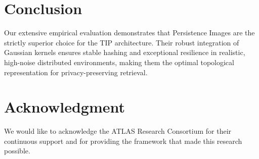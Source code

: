 \documentclass[10pt, conference]{IEEEtran}
\begin{document}
\section{Conclusion}
Our extensive empirical evaluation demonstrates that Persistence Images are the strictly superior choice for the TIP architecture. Their robust integration of Gaussian kernels ensures stable hashing and exceptional resilience in realistic, high-noise distributed environments, making them the optimal topological representation for privacy-preserving retrieval.

\section*{Acknowledgment}
We would like to acknowledge the ATLAS Research Consortium for their continuous support and for providing the framework that made this research possible.



\end{document}
